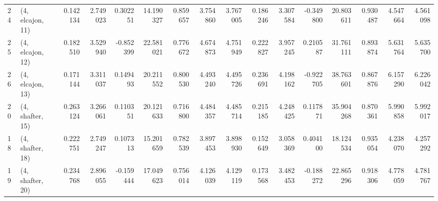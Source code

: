 \begin{tabular}{llrrrrrrrrrrrrrr}
24 &  (4, elcajon, 11) &   0.142134 &  2.749023 &  0.302251 &  14.190327 &  0.859657 &   3.754860 &  3.767005 &  0.186246 &  3.307584 & -0.349800 &   20.803611 &  0.930487 &   4.547664 &   4.561098 \\
25 &  (4, elcajon, 12) &   0.182510 &  3.529940 & -0.852399 &  22.581021 &  0.776672 &   4.674873 &  4.751949 &  0.222827 &  3.957245 &  0.210587 &   31.761111 &  0.893874 &   5.631764 &   5.635700 \\
26 &  (4, elcajon, 13) &   0.171144 &  3.311037 &  0.149493 &  20.211552 &  0.800530 &   4.493240 &  4.495726 &  0.236691 &  4.198162 & -0.922705 &   38.763601 &  0.867876 &   6.157290 &   6.226042 \\
20 &  (4, shafter, 15) &   0.263124 &  3.266061 &  0.110351 &  20.121633 &  0.716800 &   4.484357 &  4.485714 &  0.215185 &  4.248425 &  0.117871 &   35.904268 &  0.870361 &   5.990858 &   5.992017 \\
18 &  (4, shafter, 18) &   0.222751 &  2.749247 &  0.107313 &  15.201659 &  0.782539 &   3.897453 &  3.898930 &  0.152649 &  3.058369 &  0.404100 &   18.124534 &  0.935054 &   4.238070 &   4.257292 \\
19 &  (4, shafter, 20) &   0.234768 &  2.896055 & -0.159444 &  17.049623 &  0.756014 &   4.126039 &  4.129119 &  0.173568 &  3.482453 & -0.188272 &   22.865296 &  0.918306 &   4.778059 &   4.781767 \\
\bottomrule
\end{tabular}
